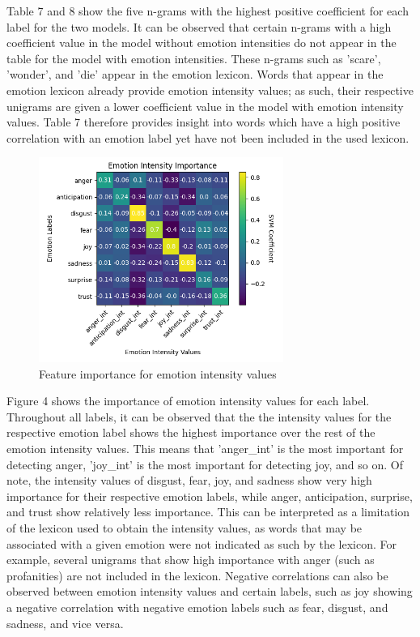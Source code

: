 \documentclass[journal]{./IEEE/IEEEtran}
\begin{document}
Table 7 and 8 show the five n-grams with the highest positive coefficient for each label for the two models. It can be observed that certain n-grams with a high coefficient value in the model without emotion intensities do not appear in the table for the model with emotion intensities. These n-grams such as 'scare', 'wonder', and 'die' appear in the emotion lexicon. Words that appear in the emotion lexicon already provide emotion intensity values; as such, their respective unigrams are given a lower coefficient value in the model with emotion intensity values. Table 7 therefore provides insight into words which have a high positive correlation with an emotion label yet have not been included in the used lexicon.

\begin{figure}[h!]
    \centering
    \includegraphics[width=8cm]{./images/emoimp.png}
    \caption{Feature importance for emotion intensity values}
    \label{fig:chart}
\end{figure}

Figure 4 shows the importance of emotion intensity values for each label. Throughout all labels, it can be observed that the the intensity values for the respective emotion label shows the highest importance over the rest of the emotion intensity values. This means that 'anger\_int' is the most important for detecting anger, 'joy\_int' is the most important for detecting joy, and so on. Of note, the intensity values of disgust, fear, joy, and sadness show very high importance for their respective emotion labels, while anger, anticipation, surprise, and trust show relatively less importance. This can be interpreted as a limitation of the lexicon used to obtain the intensity values, as words that may be associated with a given emotion were not indicated as such by the lexicon. For example, several unigrams that show high importance with anger (such as profanities) are not included in the lexicon. Negative correlations can also be observed between emotion intensity values and certain labels, such as joy showing a negative correlation with negative emotion labels such as fear, disgust, and sadness, and vice versa.
\end{document}
